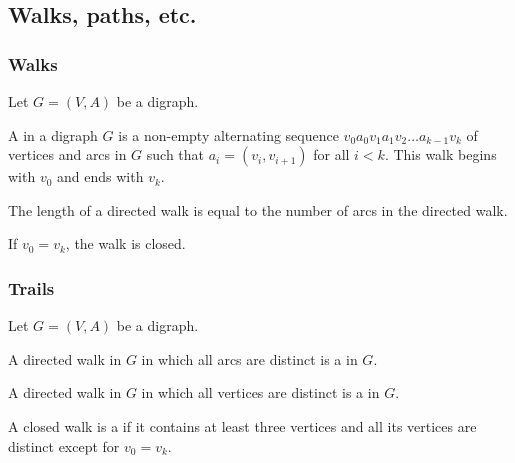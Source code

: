 \documentclass[aspectratio=43]{beamer}
\begin{document}
\subsection{Walks, paths, etc.}
\begin{frame}\frametitle{Walks}
	Let $G=(V,A)$ be a digraph.
	\begin{definition}
	A  in a digraph $G$ is a non-empty alternating sequence $v_0 a_0 v_1 a_1 v_2 \dots a_{k-1} v_k$ of vertices and arcs in $G$ such that $a_i=(v_i, v_{i+1})$ for all $i<k$. 
	This walk begins with $v_0$ and ends with $v_k$.
	\end{definition}
	\begin{definition}
	The length of a directed walk is equal to the number of arcs in the directed walk.
	\end{definition}
	\begin{definition}
	If $v_0=v_k$, the walk is closed.
	\end{definition}
\end{frame}


\begin{frame}\frametitle{Trails}
	Let $G=(V,A)$ be a digraph.
	\begin{definition}
	A directed walk in $G$ in which all arcs are distinct is a  in $G$.
	\end{definition}
	\begin{definition}
	A directed walk in $G$ in which all vertices are distinct is a  in $G$.
	\end{definition}
	\begin{definition}
	A closed walk is a  if it contains at least three vertices and all its vertices are distinct except for $v_0=v_k$.
	\end{definition}
\end{frame}
\end{document}
